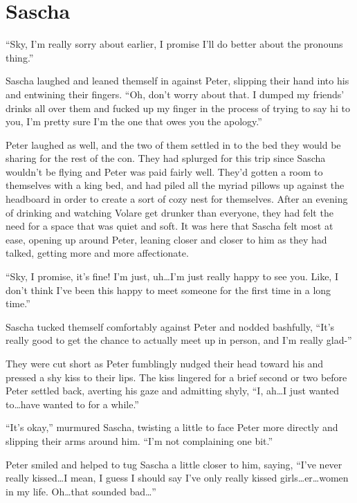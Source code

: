 \chapter{Sascha}

``Sky, I'm really sorry about earlier, I promise I'll do better about the pronouns thing.''

Sascha laughed and leaned themself in against Peter, slipping their hand into his and entwining their fingers. ``Oh, don't worry about that. I dumped my friends' drinks all over them and fucked up my finger in the process of trying to say hi to you, I'm pretty sure I'm the one that owes you the apology.''

Peter laughed as well, and the two of them settled in to the bed they would be sharing for the rest of the con. They had splurged for this trip since Sascha wouldn't be flying and Peter was paid fairly well. They'd gotten a room to themselves with a king bed, and had piled all the myriad pillows up against the headboard in order to create a sort of cozy nest for themselves. After an evening of drinking and watching Volare get drunker than everyone, they had felt the need for a space that was quiet and soft. It was here that Sascha felt most at ease, opening up around Peter, leaning closer and closer to him as they had talked, getting more and more affectionate.

``Sky, I promise, it's fine! I'm just, uh\ldots{}I'm just really happy to see you. Like, I don't think I've been this happy to meet someone for the first time in a long time.''

Sascha tucked themself comfortably against Peter and nodded bashfully, ``It's really good to get the chance to actually meet up in person, and I'm really glad-''

They were cut short as Peter fumblingly nudged their head toward his and pressed a shy kiss to their lips. The kiss lingered for a brief second or two before Peter settled back, averting his gaze and admitting shyly, ``I, ah\ldots{}I just wanted to\ldots{}have wanted to for a while.''

``It's okay,'' murmured Sascha, twisting a little to face Peter more directly and slipping their arms around him. ``I'm not complaining one bit.''

Peter smiled and helped to tug Sascha a little closer to him, saying, ``I've never really kissed\ldots{}I mean, I guess I should say I've only really kissed girls\ldots{}er\ldots{}women in my life. Oh\ldots{}that sounded bad\ldots{}''

